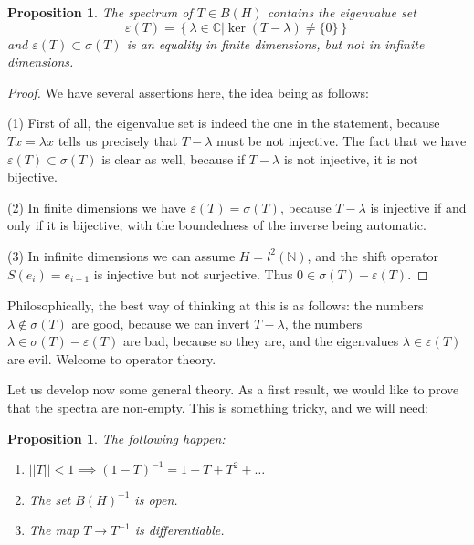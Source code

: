 \documentclass[12pt]{amsbook}
\newtheorem{proposition}[theorem]{Proposition}
\begin{document}
\begin{proposition}
The spectrum of $T\in B(H)$ contains the eigenvalue set
$$\varepsilon(T)=\left\{\lambda\in\mathbb C\Big|\ker(T-\lambda)\neq\{0\}\right\}$$
and $\varepsilon(T)\subset\sigma(T)$ is an equality in finite dimensions, but not in infinite dimensions.
\end{proposition}

\begin{proof}
We have several assertions here, the idea being as follows:

\medskip

(1) First of all, the eigenvalue set is indeed the one in the statement, because $Tx=\lambda x$ tells us precisely that $T-\lambda$ must be not injective. The fact that we have $\varepsilon(T)\subset\sigma(T)$ is clear as well, because if $T-\lambda$ is not injective, it is not bijective.

\medskip

(2) In finite dimensions we have $\varepsilon(T)=\sigma(T)$, because $T-\lambda$ is injective if and only if it is bijective, with the boundedness of the inverse being automatic. 

\medskip

(3) In infinite dimensions we can assume $H=l^2(\mathbb N)$, and the shift operator $S(e_i)=e_{i+1}$ is injective but not surjective. Thus $0\in\sigma(T)-\varepsilon(T)$.
\end{proof}

Philosophically, the best way of thinking at this is as follows: the numbers $\lambda\notin\sigma(T)$ are good, because we can invert $T-\lambda$, the numbers $\lambda\in\sigma(T)-\varepsilon(T)$ are bad, because so they are, and the eigenvalues $\lambda\in\varepsilon(T)$ are evil. Welcome to operator theory.

\bigskip

Let us develop now some general theory. As a first result, we would like to prove that the spectra are non-empty. This is something tricky, and we will need:


\begin{proposition}
The following happen:
\begin{enumerate}
\item $||T||<1\implies(1-T)^{-1}=1+T+T^2+\ldots$

\item The set $B(H)^{-1}$ is open.

\item The map $T\to T^{-1}$ is differentiable.
\end{enumerate}
\end{proposition}
\end{document}
